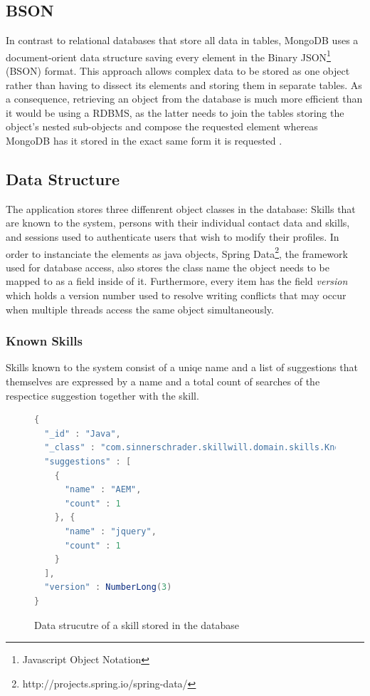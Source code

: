 \subsection{BSON}
\label{BSON}
In contrast to relational databases that store all data in tables, MongoDB uses a document-orient data structure saving every element in the Binary JSON\footnote{Javascript Object Notation} (BSON) format. This approach allows complex data to be stored as one object rather than having to dissect its elements and storing them in separate tables. As a consequence, retrieving an object from the database is much more efficient than it would be using a RDBMS, as the latter needs to join the tables storing the object's nested sub-objects and compose the requested element whereas MongoDB has it stored in the exact same form it is requested \cite[p. 10]{MongoGuide}.

\subsection{Data Structure}
The application stores three diffenrent object classes in the database: Skills that are known to the system, persons with their individual contact data and skills, and sessions used to authenticate users that wish to modify their profiles. In order to instanciate the elements as java objects, Spring Data\footnote{http://projects.spring.io/spring-data/}, the framework used for database access, also stores the class name the object needs to be mapped to as a field inside of it. Furthermore, every item has the field \textit{version} which holds a version number used to resolve writing conflicts that may occur when multiple threads access the same object simultaneously.

\subsubsection{Known Skills}
Skills known to the system consist of a uniqe name and a list of suggestions that themselves are expressed by a name and a total count of searches of the respectice suggestion together with the skill.
\begin{figure}
\begin{lstlisting}[language=Java]
{
  "_id" : "Java",
  "_class" : "com.sinnerschrader.skillwill.domain.skills.KnownSkill",
  "suggestions" : [
    {
      "name" : "AEM",
      "count" : 1
    }, {
      "name" : "jquery",
      "count" : 1
    }
  ],
  "version" : NumberLong(3)
}
\end{lstlisting}
\caption[Skill (DB Data Structure)]{Data strucutre of a skill stored in the database}
\end{figure}

